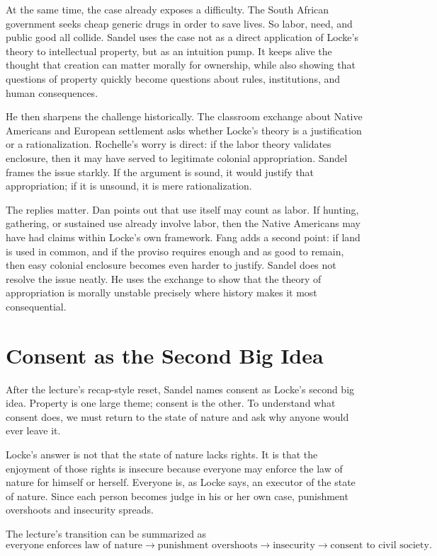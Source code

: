 At the same time, the case already exposes a difficulty. The South African government seeks cheap generic drugs in order to save lives. So labor, need, and public good all collide. Sandel uses the case not as a direct application of Locke's theory to intellectual property, but as an intuition pump. It keeps alive the thought that creation can matter morally for ownership, while also showing that questions of property quickly become questions about rules, institutions, and human consequences.

He then sharpens the challenge historically. The classroom exchange about Native Americans and European settlement asks whether Locke's theory is a justification or a rationalization. Rochelle's worry is direct: if the labor theory validates enclosure, then it may have served to legitimate colonial appropriation. Sandel frames the issue starkly. If the argument is sound, it would justify that appropriation; if it is unsound, it is mere rationalization.

The replies matter. Dan points out that use itself may count as labor. If hunting, gathering, or sustained use already involve labor, then the Native Americans may have had claims within Locke's own framework. Fang adds a second point: if land is used in common, and if the proviso requires enough and as good to remain, then easy colonial enclosure becomes even harder to justify. Sandel does not resolve the issue neatly. He uses the exchange to show that the theory of appropriation is morally unstable precisely where history makes it most consequential.

\section{Consent as the Second Big Idea}

After the lecture's recap-style reset, Sandel names consent as Locke's second big idea. Property is one large theme; consent is the other. To understand what consent does, we must return to the state of nature and ask why anyone would ever leave it.

Locke's answer is not that the state of nature lacks rights. It is that the enjoyment of those rights is insecure because everyone may enforce the law of nature for himself or herself. Everyone is, as Locke says, an executor of the state of nature. Since each person becomes judge in his or her own case, punishment overshoots and insecurity spreads.

The lecture's transition can be summarized as
\begin{equation}
\text{everyone enforces law of nature}
\to
\text{punishment overshoots}
\to
\text{insecurity}
\to
\text{consent to civil society}.
\end{equation}

